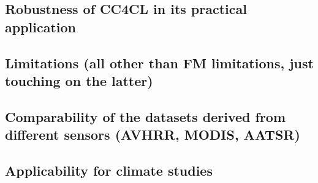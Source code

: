 \label{conclusions}

\subsection{Robustness of CC4CL in its practical application}
\subsection{Limitations (all other than FM limitations, just touching on the latter)}
\subsection{Comparability of the datasets derived from different sensors (AVHRR, MODIS, AATSR)}
\subsection{Applicability for climate studies}
